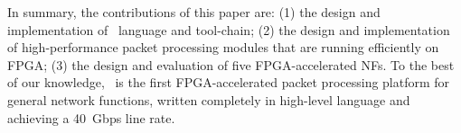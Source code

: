 In summary, the contributions of this paper are: 
(1) the design and implementation of \name\ language and tool-chain; 
(2) the design and implementation of high-performance packet processing modules that are running efficiently on FPGA; 
(3) the design and evaluation of five FPGA-accelerated NFs. 
To the best of our knowledge, \name\ is the first FPGA-accelerated packet processing platform for general network functions, 
written completely in high-level language and achieving a 40~Gbps line rate.


